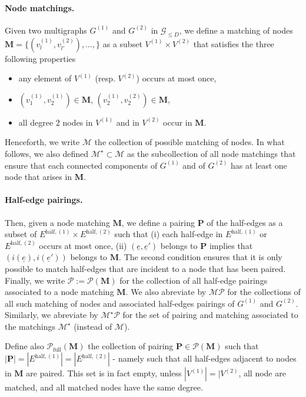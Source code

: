 \documentclass{article}
\begin{document}
\paragraph{Node matchings.} Given two multigraphs $G^{(1)}$ and $G^{(2)}$ in $\mathcal G_{\leq D}$, we define a matching of nodes $\mathbf{M}=\{(v_{l}^{(1)},v_{l'}^{(2)}), \ldots, \}$ as a subset $V^{(1)}\times V^{(2)}$ that satisfies the three following properties
\begin{itemize} 
    \item[(a)] any element of $V^{(1)}$ (resp.  $V^{(2)}$) occurs at most once,
    \item[(b)] $(v^{(1)}_1,v^{(1)}_2)\in \mathbf{M}$, $(v^{(1)}_2,v^{(2)}_2)\in \mathbf{M}$,
    \item[(c)] all degree $2$ nodes in $V^{(1)}$  and in $V^{(2)}$ occur in  $\mathbf M$.
\end{itemize}
Henceforth, we write $\mathcal{M}$ the collection of possible matching of nodes. In what follows, we also defined $\mathcal{M}^{\star} \subset \mathcal{M}$ as the subcollection of  all node matchings that ensure that each connected components of $G^{(1)}$ and of $G^{(2)}$ has at least one node that arises in $\mathbf{M}$. 


\paragraph{Half-edge pairings.} Then, given a node matching $\mathbf{M}$,  we define a pairing $\mathbf{P}$ of the half-edges as a subset of $E^{\mathrm{\mathrm{half}},(1)}\times E^{\mathrm{\mathrm{half}},(2)}$ such that (i) each half-edge in $E^{\mathrm{\mathrm{half}},(1)}$ or $E^{\mathrm{\mathrm{half}},(2)}$ occurs at most once, (ii) $(\underline{e}, \underline{e}')$ belongs to $\mathbf{P}$ implies that $(i(\underline{e}),i(\underline{e}'))$ belongs to $\mathbf{M}$. The second condition ensures that it is only possible to match half-edges that are incident to a node that has been paired.  Finally, we write $\mathcal P:=\mathcal P(\mathbf{M})$ for the collection of all half-edge pairings associated to a node matching $\mathbf{M}$. We also abreviate by $\mathcal{M}\mathcal{P}$ for the collections of all such matching of nodes and associated half-edges pairings of $G^{(1)}$ and $G^{(2)}$.  Similarly, we abreviate by $\mathcal{M}^{\star} \mathcal P$ for the set of pairing and matching associated to the matchings $\mathcal{M}^{\star}$ (instead of $\mathcal{M}$).


Define also $\mathcal{P}_{\mathrm{full}}(\mathbf{M})$ the collection of pairing $\mathbf{P} \in \mathcal P(\mathbf{M})$ such that $|\mathbf{P}|= |E^{\mathrm{\mathrm{half}},(1)}|= |E^{\mathrm{\mathrm{half}},(2)}|$ - namely such that all half-edges adjacent to nodes in $\mathbf M$ are paired. This set is in fact empty, unless $|V^{(1)}|=|V^{(2)}$, all node are matched, and all matched nodes have the same degree. 
\end{document}
